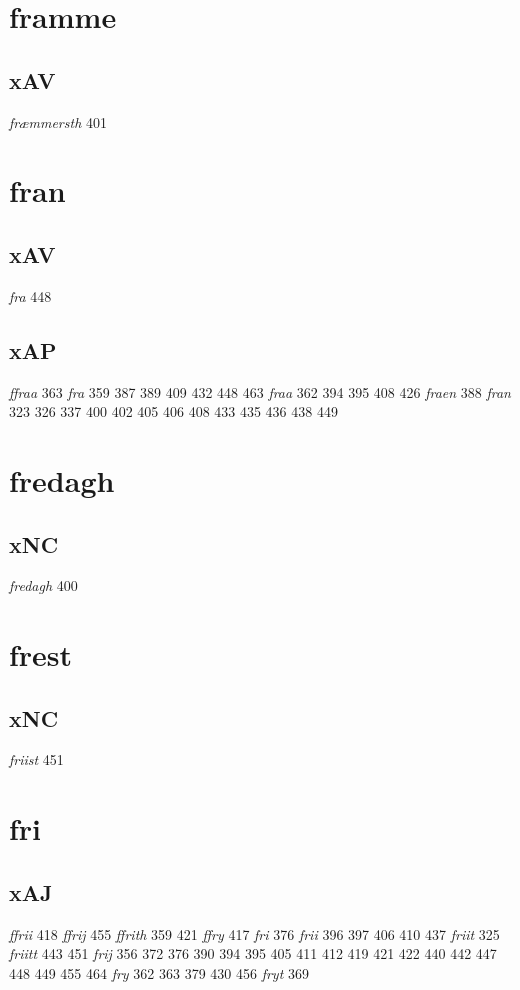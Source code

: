 \documentclass[a4paper,twocolumn]{article}
\begin{document}
\section{framme}
\label{sec:orgbbde0ff}
\subsection{xAV}
\label{sec:org3268c55}
\emph{fræmmersth} 401 
\section{fran}
\label{sec:orgb170cb9}
\subsection{xAV}
\label{sec:org2f4dcf7}
\emph{fra} 448 
\subsection{xAP}
\label{sec:org3e7dc32}
\emph{ffraa} 363 \emph{fra} 359 387 389 409 432 448 463 \emph{fraa} 362 394 395 408 426 \emph{fraen} 388 \emph{fran} 323 326 337 400 402 405 406 408 433 435 436 438 449 
\section{fredagh}
\label{sec:orgc49a52b}
\subsection{xNC}
\label{sec:org03bf79f}
\emph{fredagh} 400 
\section{frest}
\label{sec:orgbe86db6}
\subsection{xNC}
\label{sec:org111f456}
\emph{friist} 451 
\section{fri}
\label{sec:org8f82281}
\subsection{xAJ}
\label{sec:orgb9b256a}
\emph{ffrii} 418 \emph{ffrij} 455 \emph{ffrith} 359 421 \emph{ffry} 417 \emph{fri} 376 \emph{frii} 396 397 406 410 437 \emph{friit} 325 \emph{friitt} 443 451 \emph{frij} 356 372 376 390 394 395 405 411 412 419 421 422 440 442 447 448 449 455 464 \emph{fry} 362 363 379 430 456 \emph{fryt} 369 
\end{document}
